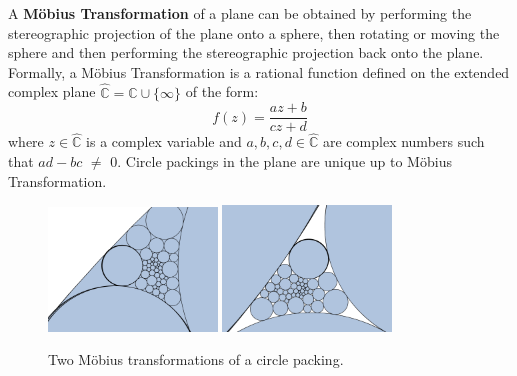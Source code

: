 \documentclass[a4paper,UKenglish]{lipics-v2016}
\newcommand{\C}{\mathbb{C}}
\newcommand{\CP}{\hat{\mathbb{C}}}
\begin{document}
  A \textbf{M\"{o}bius Transformation} of a plane can be obtained by performing the stereographic projection of the plane onto a sphere, then rotating or moving the sphere and then performing the stereographic projection back onto the plane. 
  Formally, a M\"{o}bius Transformation is a rational function defined on the extended complex plane $\CP = \C\cup\{\infty\}$ of the form:
  \begin{equation} 
  	f(z) = \frac{az+b}{cz+d}
  \end{equation}
  where $z\in\CP$ is a complex variable and $a,b,c,d\in\CP$ are complex numbers such that $ad - bc$ $\neq$ $0$.
  Circle packings in the plane are unique up to M\"{o}bius Transformation.
    \begin{figure}[ht]
      \centering
        \includegraphics[width = 0.40\textwidth]{figures/mobius3.png}
        \includegraphics[width = 0.40\textwidth]{figures/mobius4.png}
      \caption{Two M\"{o}bius transformations of a circle packing.}
      \label{fig:mobius}
    \end{figure}
\end{document}
